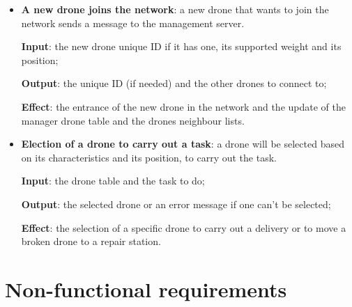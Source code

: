 \documentclass[a4paper, oneside]{memoir}
\begin{document}
\begin{itemize}
\item \textbf{A new drone joins the network}: a new drone that wants to join the network sends a message to the management server.

	\textbf{Input}: the new drone unique ID if it has one, its supported weight and its position;

	\textbf{Output}: the unique ID (if needed) and the other drones to connect to;

	\textbf{Effect}: the entrance of the new drone in the network and the update of the manager drone table and the drones neighbour lists.

\item \textbf{Election of a drone to carry out a task}: a drone will be selected based on its characteristics and its position, to carry out the task.

	\textbf{Input}: the drone table and the task to do;

	\textbf{Output}: the selected drone or an error message if one can't be selected;

	\textbf{Effect}: the selection of a specific drone to carry out a delivery or to move a broken drone to a repair station.

\end{itemize}

\section{Non-functional requirements}
\label{nfunc-req}
\end{document}
